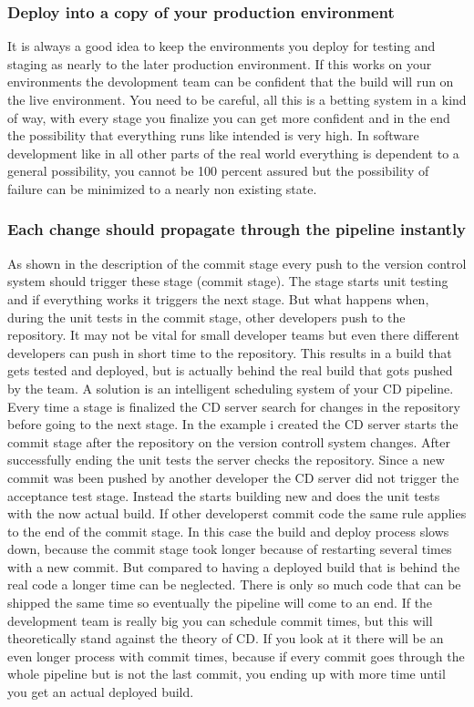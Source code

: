 \subsubsection{Deploy into a copy of your production environment}
It is always a good idea to keep the environments you deploy for testing and staging as nearly to the later production environment. If this works on
your environments the devolopment team can be confident that the build will run on the live environment. You need to be careful, all this is a betting
system in a kind of way, with every stage you finalize you can get more confident and in the end the possibility that everything runs like intended is
very high. In software development like in all other parts of the real world everything is dependent to a general possibility, you cannot be 100 percent
assured but the possibility of failure can be minimized to a nearly non existing state.

\subsubsection{Each change should propagate through the pipeline instantly}
As shown in the description of the commit stage every push to the version control system should trigger these stage (commit stage). The stage starts
unit testing and if everything works it triggers the next stage. But what happens when, during the unit tests in the commit stage, other developers push
to the repository. It may not be vital for small developer teams but even there different developers can push in short time to the repository. This results
in a build that gets tested and deployed, but is actually behind the real build that gots pushed by the team. A solution is an intelligent scheduling
system of your CD pipeline. Every time a stage is finalized the CD server search for changes in the repository before going to the next stage. In the
example i created the CD server starts the commit stage after the repository on the version controll system changes. After successfully ending the unit
tests the server checks the repository. Since a new commit was been pushed by another developer the CD server did not trigger the acceptance test stage.
Instead the starts building new and does the unit tests with the now actual build. If other developerst commit code the same rule applies to the end of the
commit stage. In this case the build and deploy process slows down, because the commit stage took longer because of restarting several times with a new
commit. But compared to having a deployed build that is behind the real code a longer time can be neglected. There is only so much code that can be shipped
the same time so eventually the pipeline will come to an end. If the development team is really big you can schedule commit times, but this will theoretically
stand against the theory of CD. If you look at it there will be an even longer process with commit times, because if every commit goes through the whole
pipeline but is not the last commit, you ending up with more time until you get an actual deployed build.

